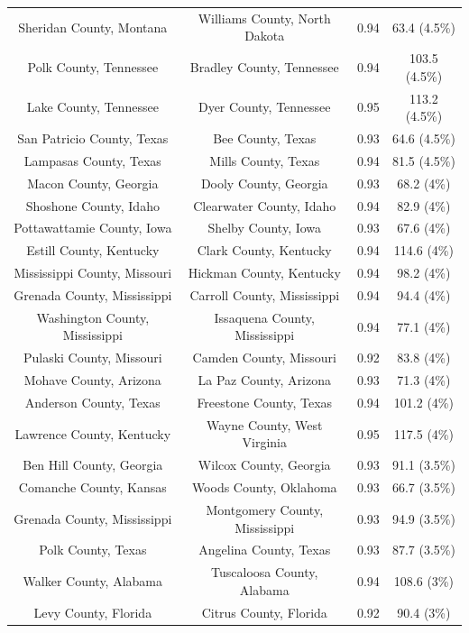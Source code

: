 \begin{longtable}{cccc}
  Sheridan County, Montana & Williams County, North Dakota & 0.94 & 63.4 (4.5\%) \\ 
  Polk County, Tennessee & Bradley County, Tennessee & 0.94 & 103.5 (4.5\%) \\ 
  Lake County, Tennessee & Dyer County, Tennessee & 0.95 & 113.2 (4.5\%) \\ 
  San Patricio County, Texas & Bee County, Texas & 0.93 & 64.6 (4.5\%) \\ 
  Lampasas County, Texas & Mills County, Texas & 0.94 & 81.5 (4.5\%) \\ 
  Macon County, Georgia & Dooly County, Georgia & 0.93 & 68.2 (4\%) \\ 
  Shoshone County, Idaho & Clearwater County, Idaho & 0.94 & 82.9 (4\%) \\ 
  Pottawattamie County, Iowa & Shelby County, Iowa & 0.93 & 67.6 (4\%) \\ 
  Estill County, Kentucky & Clark County, Kentucky & 0.94 & 114.6 (4\%) \\ 
  Mississippi County, Missouri & Hickman County, Kentucky & 0.94 & 98.2 (4\%) \\ 
  Grenada County, Mississippi & Carroll County, Mississippi & 0.94 & 94.4 (4\%) \\ 
  Washington County, Mississippi & Issaquena County, Mississippi & 0.94 & 77.1 (4\%) \\ 
  Pulaski County, Missouri & Camden County, Missouri & 0.92 & 83.8 (4\%) \\ 
  Mohave County, Arizona & La Paz County, Arizona & 0.93 & 71.3 (4\%) \\ 
  Anderson County, Texas & Freestone County, Texas & 0.94 & 101.2 (4\%) \\ 
  Lawrence County, Kentucky & Wayne County, West Virginia & 0.95 & 117.5 (4\%) \\ 
  Ben Hill County, Georgia & Wilcox County, Georgia & 0.93 & 91.1 (3.5\%) \\ 
  Comanche County, Kansas & Woods County, Oklahoma & 0.93 & 66.7 (3.5\%) \\ 
  Grenada County, Mississippi & Montgomery County, Mississippi & 0.93 & 94.9 (3.5\%) \\ 
  Polk County, Texas & Angelina County, Texas & 0.93 & 87.7 (3.5\%) \\ 
  Walker County, Alabama & Tuscaloosa County, Alabama & 0.94 & 108.6 (3\%) \\ 
  Levy County, Florida & Citrus County, Florida & 0.92 & 90.4 (3\%) \\ 

\end{longtable}
